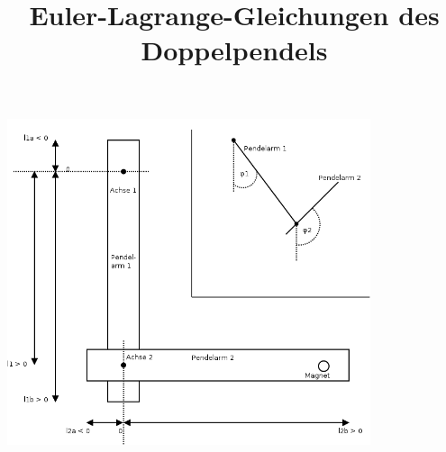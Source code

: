 \documentclass[a3paper, 12pt, landscape]{article}
\title{\vspace{-4cm}\fontsize{96pt}{100pt}\selectfont Euler-Lagrange-Gleichungen des Doppelpendels}
\author{ }
\date{ }
\newenvironment{Figure}
  {\par\medskip\noindent\minipage{\linewidth}}
  {\endminipage\par\medskip}
\begin{document}
\LARGE
\maketitle

\begin{multicols}{2}

\begin{Figure}
\centering
\includegraphics[width=0.8\textwidth]{../images/links_mathsketch_dia.png}
\end{Figure}
\columnbreak


\end{multicols}
\end{document}
